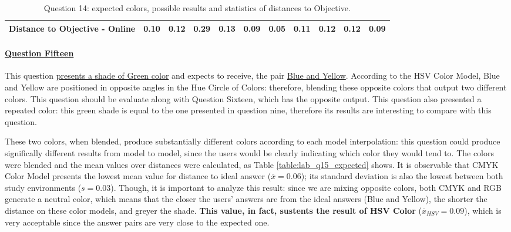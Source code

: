 \begin{table}[H]
{\begin{tabular}{lccccccccccccc}
    \multicolumn{4}{l}{Distance to Objective - Online}                                                                                               & \multicolumn{1}{|c}{0.10}        & \multicolumn{1}{c|}{0.12}    & \multicolumn{1}{|c}{0.29}        & \multicolumn{1}{c|}{0.13}    & \multicolumn{1}{|c}{\textbf{0.09}}       & \multicolumn{1}{c|}{0.05}    & \multicolumn{1}{|c}{0.11}        & \multicolumn{1}{c|}{0.12}    & \multicolumn{1}{|c}{0.12}       & \multicolumn{1}{c|}{0.09}    \\ \hline
    \end{tabular}}
  \caption[Question 14, with expected Results.]{Question 14: expected colors, possible results and statistics of distances to Objective.}
  \label{table:lab_q14_expected}
\end{table}
%
\paragraph{\ul{Question Fifteen}}
%
This question \ul{presents a shade of Green color} and expects to receive, the pair \ul{Blue and Yellow}. According to the HSV Color Model, Blue and Yellow are positioned in
opposite angles in the Hue Circle of Colors: therefore, blending these opposite colors that output two different colors. This question should be evaluate along with Question Sixteen, which has
the opposite output. This question also presented a repeated color: this green shade is equal to the one presented in question nine, therefore its results are interesting to compare with this question.\par
%
These two colors, when blended, produce substantially different colors according to each model interpolation: this question could produce significally different results from model to model,
since the users would be clearly indicating which color they would tend to.
The colors were blended and the mean values over distances were calculated, as Table \ref{table:lab_q15_expected} shows. It is observable that CMYK Color Model presents the lowest mean value
for distance to ideal answer ($\overline{x} = 0.06$); its standard deviation is also the lowest between both study environments ($s = 0.03$). Though, it is important to analyze this result: since we
are mixing opposite colors, both CMYK and RGB generate a neutral color, which means that the closer the users' answers are from the ideal answers (Blue and Yellow), the shorter the distance on these color
models, and greyer the shade. \textbf{This value, in fact, sustents the result of HSV Color} ($\overline{x}_{HSV} = 0.09$), which is very acceptable since the answer pairs are very close to the expected one. \par
